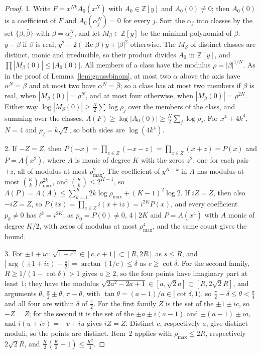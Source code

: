 \documentclass[11pt]{article}
\begin{document}
\begin{proof}
1.  Write $F=x^{Nk}A_0(x^N)$ with $A_0\in\mathbb Z[y]$ and $A_0(0)\ne0$; then
$A_0(0)$ is a coefficient of $F$ and $A_0(\alpha_j^N)=0$ for every $j$.  Sort
the $\alpha_j$ into classes by the set $\{\beta,\bar\beta\}$ with
$\beta=\alpha_j^N$, and let $M_\beta\in\mathbb Z[y]$ be the minimal polynomial of
$\beta$: $y-\beta$ if $\beta$ is real, $y^2-2(\operatorname{Re}\beta)y+|\beta|^2$ otherwise.
The $M_\beta$ of distinct classes are distinct, monic and irreducible, so their
product divides $A_0$ in $\mathbb Z[y]$, and $\prod|M_\beta(0)|\le|A_0(0)|$.  All
members of a class have the modulus $\rho=|\beta|^{1/N}$.  As in the proof of
Lemma~\ref{lem:gaussbinom}, at most two $\alpha$ above the axis have
$\alpha^N=\beta$ and at most two have $\alpha^N=\bar\beta$; so a class has at
most two members if $\beta$ is real, when $|M_\beta(0)|=\rho^N$, and at most
four otherwise, when $|M_\beta(0)|=\rho^{2N}$.  Either way
$\log|M_\beta(0)|\ge\frac N2\sum\log\rho_j$ over the members of the class, and
summing over the classes,
$\Lambda(F)\ge\log|A_0(0)|\ge\frac N2\sum_j\log\rho_j$.  For $x^4+4k^4$,
$N=4$ and $\rho_j=k\sqrt2$, so both sides are $\log(4k^4)$.

2.  If $-Z=Z$, then
$P(-x)=\prod_{z\in Z}(-x-z)=\prod_{z\in Z}(x+z)=P(x)$ and $P=A(x^2)$, where $A$
is monic of degree $K$ with the zeros $z^2$, one for each pair $\pm z$, all of
modulus at most $\rho_{\max}^2$.  The coefficient of $y^{K-k}$ in $A$ has
modulus at most $\binom Kk\rho_{\max}^{2k}$, and $\binom Kk\le2^{K-1}$, so
$\Lambda(P)=\Lambda(A)\le\sum_{k=1}^{K}2k\log\rho_{\max}+(K-1)^2\log2$.
If $iZ=Z$, then also $-iZ=Z$, so
$P(ix)=\prod_{z\in Z}i(x+iz)=i^{2K}P(x)$, and every coefficient $p_k\ne0$ has
$i^k=i^{2K}$; as $p_0=P(0)\ne0$, $4\mid 2K$ and $P=A(x^4)$ with $A$ monic of
degree $K/2$, with zeros of modulus at most $\rho_{\max}^4$, and the same count
gives the bound.

3.  For $\pm1+ic$: $\sqrt{1+c^2}\in[c,c+1]\subset[R,2R]$ as $s\le R$, and
$|\arg(\pm1+ic)-\frac\pi2|=\arctan(1/c)\le\delta$ as $c\ge\cot\delta$.  For
the second family, $R\ge1/(1-\cot\delta)>1$ gives $a\ge2$, so the four points
have imaginary part at least $1$; they have the modulus
$\sqrt{2a^2-2a+1}\in[a,\sqrt2a]\subset[R,2\sqrt2R]$, and arguments $\theta$,
$\frac\pi2\pm\theta$, $\pi-\theta$, with $\tan\theta=(a-1)/a\in[\cot\delta,1)$,
so $\frac\pi2-\delta\le\theta<\frac\pi4$ and all four are within $\delta$ of
$\frac\pi2$.  For the first family $Z$ is the set of the $\pm1\pm ic$, so
$-Z=Z$; for the second it is the set of the $\pm a\pm i(a-1)$ and
$\pm(a-1)\pm ia$, and $i(u+iv)=-v+iu$ gives $iZ=Z$.  Distinct $c$,
respectively $a$, give distinct moduli, so the points are distinct.  Item~2
applies with $\rho_{\max}\le2R$, respectively $2\sqrt2R$, and
$\frac K2(\frac K2-1)\le\frac{K^2}4$.
\end{proof}
\end{document}
